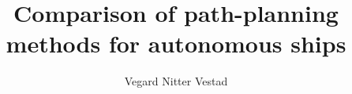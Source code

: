 
\title{Comparison of path-planning methods for autonomous ships}
\author{Vegard Nitter Vestad}


\clearpage



